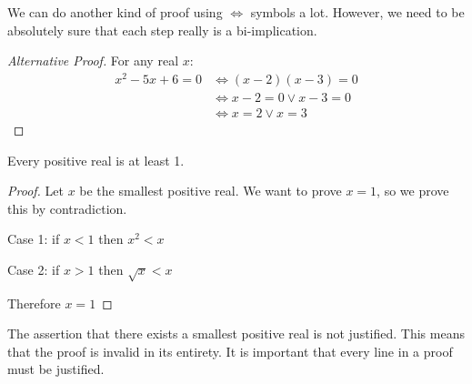 We can do another kind of proof using \(\iff\) symbols a lot.
However, we need to be absolutely sure that each step really is a bi-implication.
\begin{proof}[Alternative Proof]
	For any real \(x\):
	\begin{align*}
		x^2-5x+6=0 & \iff (x-2)(x-3) = 0       \\
		           & \iff x-2 = 0 \lor x-3 = 0 \\
		           & \iff x=2 \lor x = 3
	\end{align*}
\end{proof}

\begin{claim}
	Every positive real is at least 1.
\end{claim}
\begin{proof}
	Let \(x\) be the smallest positive real.
	We want to prove \(x=1\), so we prove this by contradiction.

	Case 1: if \(x < 1\) then \(x^2 < x\) \contradiction{}

	Case 2: if \(x > 1\) then \(\sqrt{x} < x\) \contradiction{}

	Therefore \(x=1\)
\end{proof}
\begin{note}
	The assertion that there exists a smallest positive real is not justified.
	This means that the proof is invalid in its entirety.
	It is important that every line in a proof must be justified.
\end{note}
